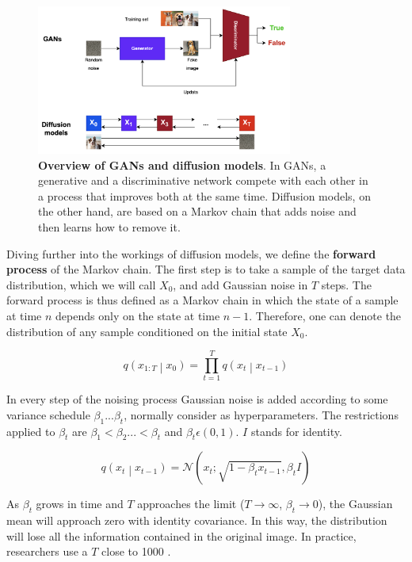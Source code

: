 \begin{figure}
    \centering
    \includegraphics[width=0.75\textwidth]{Pictures/GansvsDM} 
    \caption{\textbf{Overview of GANs and diffusion models}. In GANs, a generative and a discriminative network compete with each other in a process that improves both at the same time. Diffusion models, on the other hand, are based on a Markov chain that adds noise and then learns how to remove it.}
    \label{fig:GansvsDM}
\end{figure}

Diving further into the workings of diffusion models, we define the \textbf{forward process} of the Markov chain. The first step is to take a sample of the target data distribution, which we will call $X_0$, and add Gaussian noise in $T$ steps. The forward process is thus defined as a Markov chain in which the state of a sample at time $n$ depends only on the state at time $n-1$. Therefore, one can denote the distribution of any sample conditioned on the initial state $X_0$.

\[ q\left(x_{1:T}\middle| x_0\right)=\prod_{t=1}^{T}{q\left(x_t\middle| x_{t-1}\right)} \]

In every step of the noising process Gaussian noise is added according to some variance schedule $\beta_1...\beta_t$, normally consider as hyperparameters. The restrictions applied to $\beta_t$ are $\beta_1 < \beta_2 ... < \beta_t$ and $\beta_t \epsilon (0, 1)$. $I$ stands for identity.

\[q\left(x_t\middle| x_{t-1}\right)=\mathcal{N}\left(x_t;\sqrt{1-\beta_tx_{t-1}},\beta_tI\right) \]

As $\beta_t$ grows in time and $T$ approaches the limit ($T \rightarrow\infty$, $\beta_t \rightarrow 0$), the Gaussian mean will approach zero with identity covariance. In this way, the distribution will lose all the information contained in the original image. In practice, researchers use a $T$ close to 1000 \cite{ho2020denoising}.

